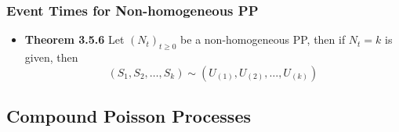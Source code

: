 \documentclass[11pt,a4paper]{article}
\begin{document}
\subsubsection{Event Times for Non-homogeneous PP}
\begin{itemize}
    \item \textbf{Theorem 3.5.6}
        Let ${(N_t)}_{t \geq 0}$ be a non-homogeneous PP, then if $N_t = k$ is given, then
        \[
            (S_1, S_2, \ldots, S_k) \sim (U_{(1)}, U_{(2)}, \ldots, U_{(k)})
        \]
\end{itemize}

\subsection{Compound Poisson Processes}
\end{document}
